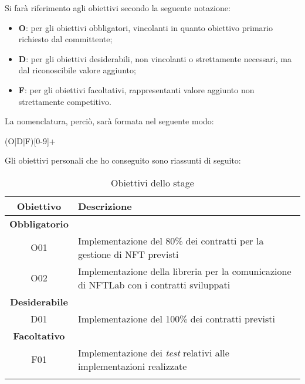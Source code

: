 \noindent Si farà riferimento agli obiettivi secondo la seguente notazione:
\begin{itemize}
  \item \textbf{O}: per gli obiettivi obbligatori, vincolanti in quanto obiettivo primario richiesto dal committente;
  \item \textbf{D}: per gli obiettivi desiderabili, non vincolanti o strettamente necessari, ma dal riconoscibile valore aggiunto;
  \item \textbf{F}: per gli obiettivi facoltativi, rappresentanti valore aggiunto non strettamente competitivo.
\end{itemize}

\noindent La nomenclatura, perciò, sarà formata nel seguente modo:
\begin{center}
  (O|D|F)[0-9]+
\end{center}

\noindent Gli obiettivi personali che ho conseguito sono riassunti di seguito:
\begin{longtabu}{|c|X|}
  \hline

  \textbf{Obiettivo} & \textbf{Descrizione} \\ \hline

  \textbf{Obbligatorio} & \\

  O01       & Implementazione del 80\% dei contratti per la gestione di NFT previsti \\
  O02       & Implementazione della libreria per la comunicazione di NFTLab con i contratti sviluppati \\

  \hline

  \textbf{Desiderabile} &  \\
  
  D01       & Implementazione del 100\% dei contratti previsti \\

  \hline

  \textbf{Facoltativo} & \\

  F01       & Implementazione dei \textit{test} relativi alle implementazioni realizzate \\

  \hline

  \caption{Obiettivi dello stage}
\end{longtabu}

